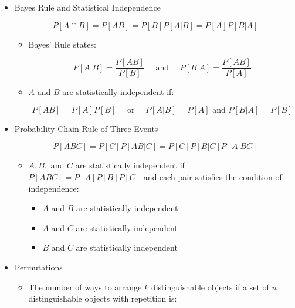 \begin{itemize}
\begin{itemize}
    \end{itemize}

  \item Bayes Rule and Statistical Independence

    $$P[A\cap B]=P[AB]=P[B]P[A|B]=P[A]P[B|A]$$

    \begin{itemize}

      \item Bayes' Rule states:

        $$P[A|B]=\frac{P[AB]}{P[B]}\quad\text{ and }\quad P[B|A]=\frac{P[AB]}{P[A]}$$

      \item $A$ and $B$ are statistically independent if:

        $$P[AB]=P[A]P[B]\quad\text{ or }\quad P[A|B]=P[A]\text{ and }P[B|A]=P[B]$$

    \end{itemize}

  \item Probability Chain Rule of Three Events

    $$P[ABC]=P[C]P[AB|C]=P[C]P[B|C]P[A|BC]$$

    \begin{itemize}

      \item $A,B,$ and $C$ are statistically independent if $P[ABC]=P[A]P[B]P[C]$ and each pair satisfies the condition of independence:

        \begin{itemize}

          \item $A$ and $B$ are statistically independent

          \item $A$ and $C$ are statistically independent

          \item $B$ and $C$ are statistically independent

        \end{itemize}

    \end{itemize}

  \item Permutations

    \begin{itemize}
        
      \item The number of ways to arrange $k$ distinguishable objects if a set of $n$ distinguishable objects with repetition is:


\end{itemize}
\end{itemize}
